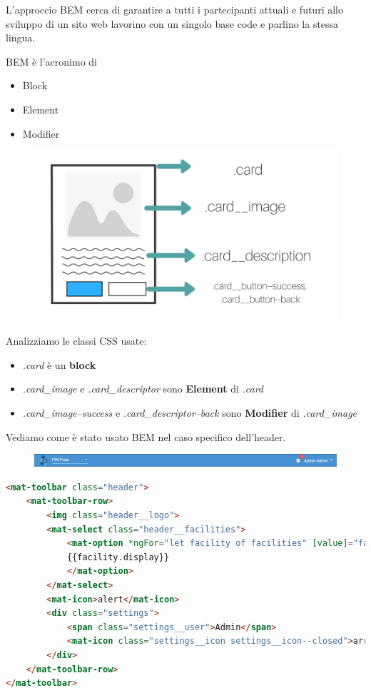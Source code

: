 L'approccio BEM cerca di garantire a tutti i partecipanti attuali e futuri allo sviluppo di un sito web
lavorino con un singolo base code e parlino la stessa lingua. 

BEM è l'acronimo di 
\begin{itemize}
\item Block
\item Element
\item Modifier
\end{itemize}

\begin{figure}[H]
    \centering  
    \includegraphics[scale=0.4]{img/cap3/bem}
\end{figure}

Analizziamo le classi CSS usate:

\begin{itemize}
    \item \textit{.card} è un \textbf{block}
    \item \textit{.card{\_}image} e  \textit{.card{\_}descriptor} sono \textbf{Element} di \textit{.card}
    \item \textit{.card{\_}image--success} e  \textit{.card{\_}descriptor--back} sono 
    \textbf{Modifier} di \textit{.card{\_}image}
\end{itemize}

Vediamo come è stato usato BEM nel caso specifico dell'header.

\begin{figure}[H]
    \centering  
    \includegraphics[scale=0.4]{img/cap3/header}
\end{figure}

\begin{lstlisting}[language=html]
<mat-toolbar class="header">
    <mat-toolbar-row>
        <img class="header__logo">
        <mat-select class="header__facilities">
            <mat-option *ngFor="let facility of facilities" [value]="facility.value">
            {{facility.display}}
            </mat-option>
        </mat-select>
        <mat-icon>alert</mat-icon>
        <div class="settings">
            <span class="settings__user">Admin</span>
            <mat-icon class="settings__icon settings__icon--closed">arrow-down</mat-icon>
        </div>
    </mat-toolbar-row>
</mat-toolbar>
\end{lstlisting}
